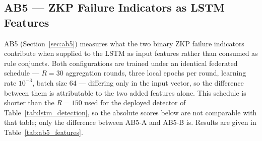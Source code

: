 \documentclass[12pt, a4paper]{report}
\begin{document}
{{\subsection{AB5 --- ZKP Failure Indicators as \ac{LSTM} Features}
\label{sec:ab5_results}

AB5 (Section~\ref{sec:ab5}) measures what the two binary
\ac{ZKP} failure indicators contribute when supplied to the
\ac{LSTM} as input features rather than consumed as rule
conjuncts. Both configurations are trained under an identical
federated schedule --- $R = 30$ aggregation rounds, three local
epochs per round, learning rate $10^{-3}$, batch size 64 ---
differing only in the input vector, so the difference between
them is attributable to the two added features alone. This
schedule is shorter than the $R = 150$ used for the deployed
detector of Table~\ref{tab:lstm_detection}, so the absolute
scores below are not comparable with that table; only the
difference between AB5-A and AB5-B is. Results are given in
Table~\ref{tab:ab5_features}.

}}
\end{document}
